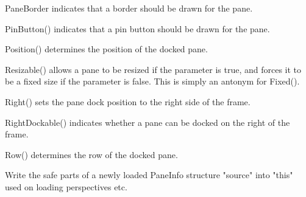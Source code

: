 
PaneBorder indicates that a border should be drawn for the pane.

\label{wxauipaneinfopinbutton}


PinButton() indicates that a pin button should be drawn for the pane.

\label{wxauipaneinfoposition}


Position() determines the position of the docked pane.

\label{wxauipaneinforesizable}


Resizable() allows a pane to be resized if the parameter is true, and forces it to be a fixed size if the parameter is false. This is simply an antonym for Fixed().

\label{wxauipaneinforight}


Right() sets the pane dock position to the right side of the frame.

\label{wxauipaneinforightdockable}


RightDockable() indicates whether a pane can be docked on the right of the frame.

\label{wxauipaneinforow}


Row() determines the row of the docked pane.

\label{wxauipaneinfosafeset}


Write the safe parts of a newly loaded PaneInfo structure "source" into "this"
used on loading perspectives etc.

\label{wxauipaneinfosetflag}

